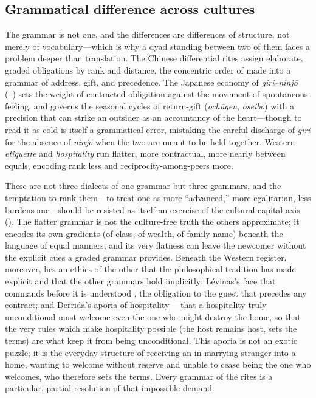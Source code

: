\subsection{Grammatical difference across cultures}
The grammar is not one, and the differences are differences of structure, not merely of vocabulary---which is why a dyad standing between two of them faces a problem deeper than translation. The Chinese differential rites assign elaborate, graded obligations by rank and distance, the concentric order of  made into a grammar of address, gift, and precedence. The Japanese economy of \emph{giri}--\emph{ninjō} (--) sets the weight of contracted obligation against the movement of spontaneous feeling, and governs the seasonal cycles of return-gift (\emph{ochūgen}, \emph{oseibo}) with a precision that can strike an outsider as an accountancy of the heart---though to read it as cold is itself a grammatical error, mistaking the careful discharge of \emph{giri} for the absence of \emph{ninjō} when the two are meant to be held together. Western \emph{etiquette} and \emph{hospitality} run flatter, more contractual, more nearly between equals, encoding rank less and reciprocity-among-peers more.

These are not three dialects of one grammar but three grammars, and the temptation to rank them---to treat one as more ``advanced,'' more egalitarian, less burdensome---should be resisted as itself an exercise of the cultural-capital axis (). The flatter grammar is not the culture-free truth the others approximate; it encodes its own gradients (of class, of wealth, of family name) beneath the language of equal manners, and its very flatness can leave the newcomer without the explicit cues a graded grammar provides. Beneath the Western register, moreover, lies an ethics of the other that the philosophical tradition has made explicit and that the other grammars hold implicitly: Lévinas's face that commands before it is understood \parencite{levinas1961}, the obligation to the guest that precedes any contract; and Derrida's aporia of hospitality \parencite{derrida2000hospitality}---that a hospitality truly unconditional must welcome even the one who might destroy the home, so that the very rules which make hospitality possible (the host remains host, sets the terms) are what keep it from being unconditional. This aporia is not an exotic puzzle; it is the everyday structure of receiving an in-marrying stranger into a home, wanting to welcome without reserve and unable to cease being the one who welcomes, who therefore sets the terms. Every grammar of the rites is a particular, partial resolution of that impossible demand.

